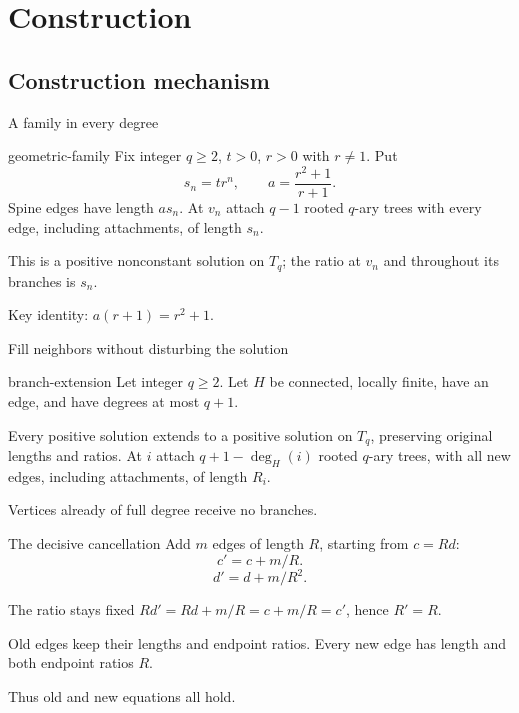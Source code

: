 \documentclass{beamer}
\begin{document}
\section{Construction}
\subsection{Construction mechanism}
\begin{frame}{A family in every degree}
\begin{bookresult}{geometric-family}
Fix integer $q\ge2$, $t>0$, $r>0$ with $r\ne1$. Put
\[
s_n=tr^n,\qquad a=\frac{r^2+1}{r+1}.
\]
Spine edges have length $as_n$. At $v_n$ attach $q-1$ rooted $q$-ary trees with every edge, including attachments, of length $s_n$.

This is a positive nonconstant solution on $T_q$; the ratio at $v_n$ and throughout its branches is $s_n$.
\end{bookresult}
Key identity: $a(r+1)=r^2+1$.
\end{frame}
\begin{frame}{Fill neighbors without disturbing the solution}
\begin{bookresult}{branch-extension}
Let integer $q\ge2$. Let $H$ be connected, locally finite, have an edge, and have degrees at most $q+1$.

Every positive solution extends to a positive solution on $T_q$, preserving original lengths and ratios. At $i$ attach $q+1-\deg_H(i)$ rooted $q$-ary trees, with all new edges, including attachments, of length $R_i$.
\end{bookresult}
Vertices already of full degree receive no branches.
\end{frame}
\begin{frame}{The decisive cancellation}
Add $m$ edges of length $R$, starting from $c=Rd$:
\[
c'=c+m/R.
\]
\[
d'=d+m/R^2.
\]
\begin{block}{The ratio stays fixed}
$Rd'=Rd+m/R=c+m/R=c'$, hence $R'=R$.
\end{block}
Old edges keep their lengths and endpoint ratios. Every new edge has length and both endpoint ratios $R$.

Thus old and new equations all hold.
\end{frame}
\end{document}
